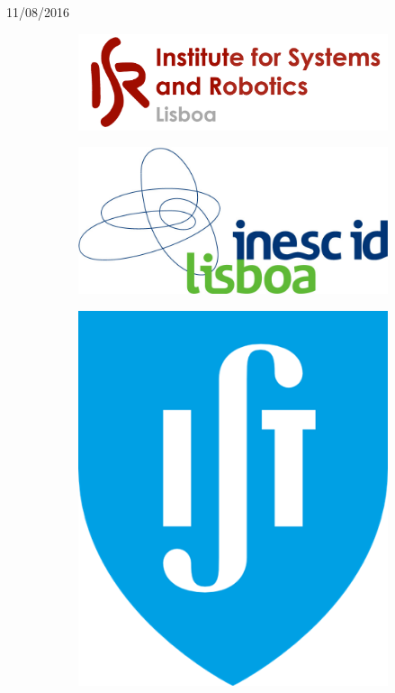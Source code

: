 \begin{titlepage}


{\large 11/08/2016}\\[1cm] %




\begin{figure}
\centering
\begin{subfigure}{.5\textwidth}
  \centering
  \includegraphics[width=.5\linewidth]{isr-logo.png}
\end{subfigure}%
\begin{subfigure}{.5\textwidth}
  \centering
  \includegraphics[width=.5\linewidth]{inesc-id-logo.png}
\end{subfigure}
\begin{subfigure}{.5\textwidth}
  \centering
  \includegraphics[width=.25\linewidth]{ist-logo.png}
\end{subfigure}
\end{figure}
 

\vfill %

\end{titlepage}

